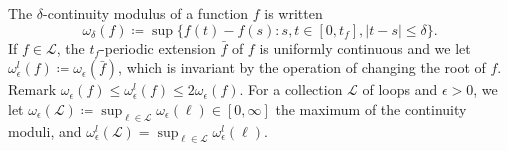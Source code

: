 \documentclass[11pt]{article}
\begin{document}
The $ \delta$-continuity modulus of a function $f$ is written
\[\omega_ \delta(f)\coloneqq \sup \{f(t)-f(s): s,t\in[0,t_f], |t-s|\leq\delta\}.\] If $f\in \mathscr{L}$, the $t_f$-periodic extension $\bar{f}$ of $f$ is uniformly continuous and we let $\omega^l_{\epsilon}(f)\coloneqq\omega_\epsilon(\bar{f})$, which is invariant by the operation of changing the root of $f$. Remark $ \omega_{\epsilon}(f)\leq \omega^l_{\epsilon}(f)\leq 2 \omega_{\epsilon}(f)$.
For a collection $\mathcal{L}$ of loops and $\epsilon>0$, we let $\omega_\epsilon(\mathcal{L})\coloneqq \sup_{\ell \in \mathcal{L}} \omega_\epsilon(\ell)\in [0,\infty]$ the maximum of the continuity moduli, and $\omega^l_{\epsilon}(\mathcal{L})=\sup_{\ell \in \mathcal{L}} \omega^l_\epsilon(\ell)$.

\smallskip
\end{document}
